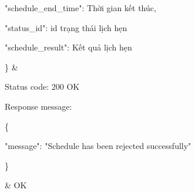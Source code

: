 \begin{enumerate}[a)]
\begin{xltabular}{\textwidth}
		      "schedule\_end\_time": Thời gian kết thúc,

		      "status\_id": id trạng thái lịch hẹn

		      "schedule\_result": Kết quả lịch hẹn

		      \}
		      &

		      Status code: 200 OK

		      Response message:

		      \{

		      "message": "Schedule has been rejected successfully"

		      \}

		      & OK

		      \\ \hline

	      \end{xltabular}

\end{enumerate}

